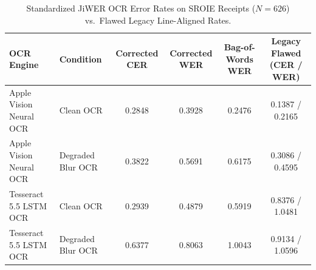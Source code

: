 \begin{table}[t]
\centering\small
\caption{Standardized JiWER OCR Error Rates on SROIE Receipts ($N=626$) vs.\ Flawed Legacy Line-Aligned Rates.}\label{tab:ocr_error_rates_v6}
\begin{tabular}{llcccc}
\toprule
OCR Engine & Condition & Corrected CER & Corrected WER & Bag-of-Words WER & Legacy Flawed (CER / WER) \\
\midrule
Apple Vision Neural OCR & Clean OCR & 0.2848 & 0.3928 & 0.2476 & 0.1387 / 0.2165 \\
Apple Vision Neural OCR & Degraded Blur OCR & 0.3822 & 0.5691 & 0.6175 & 0.3086 / 0.4595 \\
Tesseract 5.5 LSTM OCR & Clean OCR & 0.2939 & 0.4879 & 0.5919 & 0.8376 / 1.0481 \\
Tesseract 5.5 LSTM OCR & Degraded Blur OCR & 0.6377 & 0.8063 & 1.0043 & 0.9134 / 1.0596 \\
\bottomrule
\end{tabular}
\end{table}
